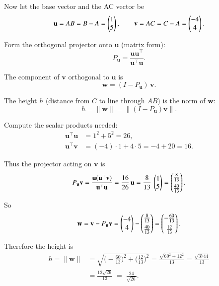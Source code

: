 \documentclass[journal]{IEEEtran}
\begin{document}
\bigskip

Now let the base vector and the AC vector be
\begin{equation}
\mathbf{u}=AB=B-A=\begin{pmatrix}1\\5\end{pmatrix},\qquad
\mathbf{v}=AC=C-A=\begin{pmatrix}-4\\4\end{pmatrix}.
\end{equation}

Form the orthogonal projector onto $\mathbf{u}$ (matrix form):
\begin{equation}
P_{\mathbf{u}}=\frac{\mathbf{u}\mathbf{u}^\top}{\mathbf{u}^\top\mathbf{u}}.
\end{equation}

The component of $\mathbf{v}$ orthogonal to $\mathbf{u}$ is
\begin{equation}
\mathbf{w}=(I-P_{\mathbf{u}})\,\mathbf{v}.
\end{equation}

The height $h$ (distance from $C$ to line through $AB$) is the norm of $\mathbf{w}$:
\begin{equation}
\label{eq:height-norm}
h=\|\mathbf{w}\|=\big\|(I-P_{\mathbf{u}})\mathbf{v}\big\|.
\end{equation}

Compute the scalar products needed:
\begin{align}
\mathbf{u}^\top\mathbf{u}&=1^2+5^2=26, \\
\mathbf{u}^\top\mathbf{v}&=(-4)\cdot1 + 4\cdot5 = -4+20=16.
\end{align}

Thus the projector acting on $\mathbf{v}$ is
\begin{equation}
P_{\mathbf{u}}\mathbf{v}=\frac{\mathbf{u}(\mathbf{u}^\top\mathbf{v})}{\mathbf{u}^\top\mathbf{u}}
=\frac{16}{26}\,\mathbf{u}=\frac{8}{13}\,\begin{pmatrix}1\\5\end{pmatrix}
=\begin{pmatrix}\tfrac{8}{13}\\[4pt]\tfrac{40}{13}\end{pmatrix}.
\end{equation}

So
\begin{equation}
\mathbf{w}=\mathbf{v}-P_{\mathbf{u}}\mathbf{v}
=\begin{pmatrix}-4\\4\end{pmatrix}-\begin{pmatrix}\tfrac{8}{13}\\[4pt]\tfrac{40}{13}\end{pmatrix}
=\begin{pmatrix}-\tfrac{60}{13}\\[4pt]\tfrac{12}{13}\end{pmatrix}.
\end{equation}

Therefore the height is
\begin{align}
h=\|\mathbf{w}\|
&= \sqrt{\Big(-\tfrac{60}{13}\Big)^{\!2}+\Big(\tfrac{12}{13}\Big)^{\!2}}
= \frac{\sqrt{60^2+12^2}}{13}
= \frac{\sqrt{3744}}{13} \nonumber\\[4pt]
&= \frac{12\sqrt{26}}{13} \;=\; \frac{24}{\sqrt{26}}.
\end{align}
\end{document}
